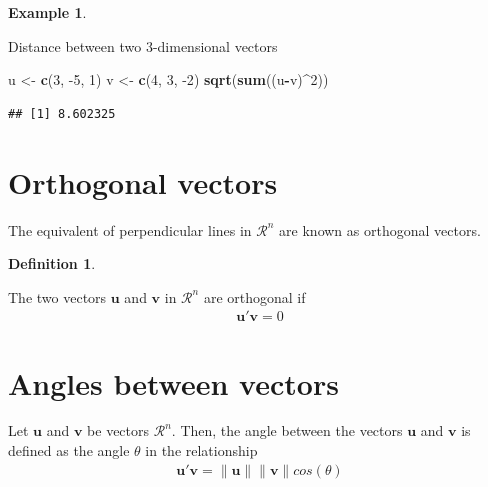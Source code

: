 \documentclass[
]{book}
\newenvironment{Shaded}{\begin{snugshade}}{\end{snugshade}}
\newcommand{\DecValTok}[1]{\textcolor[rgb]{0.00,0.00,0.81}{#1}}
\newcommand{\KeywordTok}[1]{\textcolor[rgb]{0.13,0.29,0.53}{\textbf{#1}}}
\newcommand{\NormalTok}[1]{#1}
\newcommand{\OperatorTok}[1]{\textcolor[rgb]{0.81,0.36,0.00}{\textbf{#1}}}
\newcommand{\StringTok}[1]{\textcolor[rgb]{0.31,0.60,0.02}{#1}}
\theoremstyle{definition}
\newtheorem{definition}{Definition}[chapter]
\theoremstyle{definition}
\newtheorem{example}{Example}[chapter]
\theoremstyle{definition}
\theoremstyle{remark}
\begin{document}
\begin{example}
\protect\hypertarget{exm:unlabeled-div-191}{}\label{exm:unlabeled-div-191}

Distance between two 3-dimensional vectors

\begin{Shaded}
\begin{Highlighting}[]
\NormalTok{u <-}\StringTok{ }\KeywordTok{c}\NormalTok{(}\DecValTok{3}\NormalTok{, }\DecValTok{-5}\NormalTok{, }\DecValTok{1}\NormalTok{)}
\NormalTok{v <-}\StringTok{ }\KeywordTok{c}\NormalTok{(}\DecValTok{4}\NormalTok{, }\DecValTok{3}\NormalTok{, }\DecValTok{-2}\NormalTok{)}
\KeywordTok{sqrt}\NormalTok{(}\KeywordTok{sum}\NormalTok{((u}\OperatorTok{-}\NormalTok{v)}\OperatorTok{^}\DecValTok{2}\NormalTok{))}
\end{Highlighting}
\end{Shaded}

\begin{verbatim}
## [1] 8.602325
\end{verbatim}

\end{example}

\hypertarget{orthogonal-vectors}{%
\section{Orthogonal vectors}\label{orthogonal-vectors}}

The equivalent of perpendicular lines in \(\mathcal{R}^n\) are known as orthogonal vectors.

\begin{definition}
\protect\hypertarget{def:unlabeled-div-192}{}\label{def:unlabeled-div-192}

The two vectors \(\mathbf{u}\) and \(\mathbf{v}\) in \(\mathcal{R}^n\) are orthogonal if
\[
\begin{aligned}
\mathbf{u}' \mathbf{v} = 0
\end{aligned}
\]

\end{definition}

\hypertarget{angles-between-vectors}{%
\section{Angles between vectors}\label{angles-between-vectors}}

Let \(\mathbf{u}\) and \(\mathbf{v}\) be vectors \(\mathcal{R}^n\). Then, the angle between the vectors \(\mathbf{u}\) and \(\mathbf{v}\) is defined as the angle \(\theta\) in the relationship
\[
\begin{aligned}
\mathbf{u}' \mathbf{v} = \| \mathbf{u} \| \| \mathbf{v} \| cos(\theta)
\end{aligned}
\]
\end{document}
